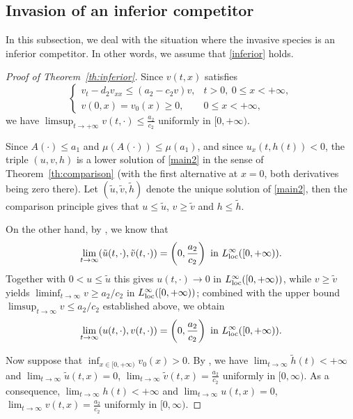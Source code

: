 \documentclass[reqno]{amsart}
\newcommand{\rev}[1]{#1}
\theoremstyle{plain}
\theoremstyle{definition}
\theoremstyle{remark}
\begin{document}
	\subsection{Invasion of an inferior competitor}
	In this subsection, we deal with the situation where the invasive species is an inferior competitor. In other words, we assume that \eqref{inferior} holds.
	
	\begin{proof}[Proof of Theorem~\ref{th:inferior}]
		Since $v(t,x)$ satisfies
		\[
		\begin{cases}
			v_t - d_2 v_{xx} \le (a_2 - c_2 v)v, & t>0, ~ 0\le x<+\infty,\\
			v(0,x) = v_0(x) \ge 0,                & 0\le x<+\infty,
		\end{cases}
		\]
		we have $\limsup_{t\to+\infty} v(t,\cdot) \le \frac{a_2}{c_2}$ uniformly in
		$[0, +\infty)$.
		
		\rev{Since $A(\cdot)\le a_1$ and $\mu(A(\cdot))\le\mu(a_1)$, and since
		$u_x(t,h(t))<0$, the triple $(u,v,h)$ is a lower solution of
		\eqref{main2} in the sense of Theorem~\ref{th:comparison} (with the first
		alternative at $x=0$, both derivatives being zero there).}
		Let $(\tilde{u},\tilde{v},\tilde{h})$ denote the unique solution of \eqref{main2}, then the comparison principle gives that
		$u \le \tilde{u}$, $v \ge \tilde{v}$ and $h \le \tilde{h}$.
		
		On the other hand, by \cite[Theorem~3.1]{MR3327894}, we know that
		\[
		\lim_{t\to\infty} (\tilde{u}(t,\cdot), \tilde{v}(t,\cdot))
		= \left(0, \frac{a_2}{c_2}\right) \text{ in } L^\infty_{\rm loc}([0,+\infty)).
		\]
		\rev{Together with $0<u\le\tilde u$ this gives $u(t,\cdot)\to0$ in
		$L^\infty_{\rm loc}([0,+\infty))$, while $v\ge\tilde v$ yields
		$\liminf_{t\to\infty}v\ge a_2/c_2$ in $L^\infty_{\rm loc}([0,+\infty))$;
		combined with the upper bound $\limsup_{t\to\infty}v\le a_2/c_2$
		established above, we obtain}
		\[
		\lim_{t\to\infty} (u(t,\cdot), v(t,\cdot))
		= \left(0, \frac{a_2}{c_2}\right) \text{ in } L^\infty_{\rm loc}([0,+\infty)).
		\]
		
		Now suppose that $\inf_{x\in[0,+\infty)} v_0(x) > 0$. By
		\cite[Theorem~3.3]{MR3327894}, we have $\lim_{t\to\infty} \tilde{h}(t)
		< +\infty$ and $\lim_{t\to\infty} \tilde{u}(t,x) = 0$,
		$\lim_{t\to\infty} \tilde{v}(t,x) = \frac{a_2}{c_2}$ uniformly in
		$[0, \infty)$. As a consequence, $\lim_{t\to\infty} h(t) < +\infty$ and
		$\lim_{t\to\infty} u(t,x) = 0$, $\lim_{t\to\infty} v(t,x) =
		\frac{a_2}{c_2}$ uniformly in $[0, \infty)$.
	\end{proof}
	
\end{document}
